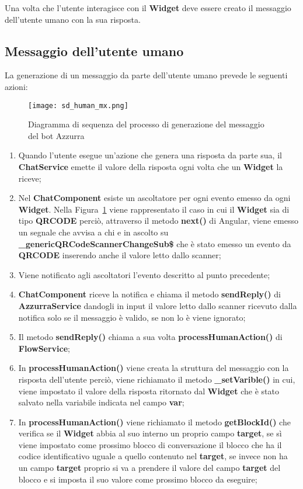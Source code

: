 Una volta che l'utente interagisce con il \textbf{Widget} deve essere creato il messaggio dell'utente umano con la sua risposta. 
\clearpage
\subsection{Messaggio dell’utente  umano}
La generazione di un messaggio da parte dell’utente umano prevede le seguenti azioni:\\
\begin{figure}[htbp]
	\centering
	\texttt{[image: sd\_human\_mx.png]}
	\caption{Diagramma di sequenza del processo di generazione del messaggio del bot Azzurra}\label{fig:mxHuman}
\end{figure}
\begin{enumerate}
	\item Quando l'utente esegue un'azione che genera una risposta da parte sua, il \textbf{ChatService} emette il valore della risposta ogni volta che un \textbf{Widget} la riceve;
	\item Nel \textbf{ChatComponent} esiste un ascoltatore per ogni evento emesso da ogni \textbf{Widget}. Nella Figura~\ref{fig:mxHuman} viene rappresentato il caso in cui il \textbf{Widget} sia di tipo \textbf{QRCODE} perciò, attraverso il metodo \textbf{next()} di Angular, viene emesso un segnale che avvisa a chi e in ascolto su  \textbf{\_genericQRCodeScannerChangeSub\$} che è stato emesso un evento da \textbf{QRCODE} inserendo anche il valore letto dallo scanner;
	\item Viene notificato agli ascoltatori l'evento descritto al punto precedente;
	\item \textbf{ChatComponent} riceve la notifica e chiama il metodo \textbf{sendReply()} di \textbf{AzzurraService} dandogli in input il valore letto dallo scanner ricevuto dalla notifica solo se il messaggio è valido, se non lo è viene ignorato;	
	\item Il metodo \textbf{sendReply()} chiama a sua volta \textbf{processHumanAction()} di \textbf{FlowService};
	\item In \textbf{processHumanAction()} viene creata la struttura del messaggio con la risposta dell'utente perciò, viene richiamato il metodo \textbf{\_setVarible()} in cui, viene impostato il valore della risposta ritornato dal \textbf{Widget} che è stato salvato nella variabile indicata nel campo \textbf{var};
	\item In \textbf{processHumanAction()} viene richiamato il metodo \textbf{getBlockId()} che verifica se il \textbf{Widget} abbia al suo interno un proprio campo \textbf{target}, se sì viene impostato come prossimo blocco di conversazione il blocco che ha il codice identificativo uguale a quello contenuto nel \textbf{target}, se invece non ha un campo \textbf{target} proprio si va a prendere il valore del campo \textbf{target} del blocco e si imposta il suo valore come prossimo blocco da eseguire;

\end{enumerate}
